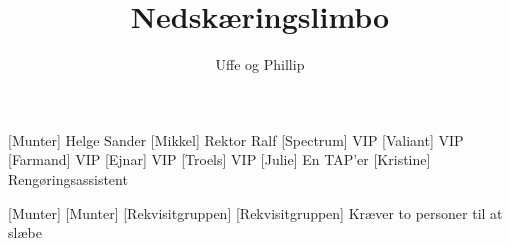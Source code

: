 \documentclass[a4paper,11pt]{article}
\title{Nedskæringslimbo}
\author{Uffe og Phillip}
\begin{document}
\maketitle

\begin{roles}  
[Munter]  Helge Sander
[Mikkel] Rektor Ralf
[Spectrum]  VIP
[Valiant]  VIP
[Farmand]  VIP
[Ejnar]  VIP
[Troels]  VIP
[Julie]  En TAP'er
[Kristine]  Rengøringsassistent
\end{roles}

\begin{props}
[Munter]
[Munter]
[Rekvisitgruppen]
[Rekvisitgruppen] Kræver to personer til at slæbe
\end{props}
\end{document}
